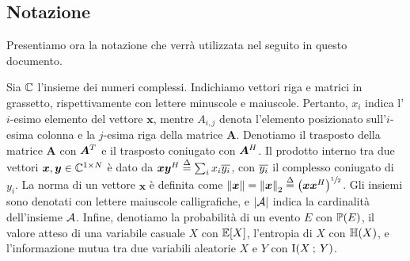 \subsection*{Notazione}

Presentiamo ora la notazione che verrà utilizzata nel seguito in questo
documento.

Sia \(\mathbb{C}\) l'insieme dei numeri complessi. Indichiamo vettori riga e matrici in
grassetto, rispettivamente con lettere minuscole e maiuscole.  Pertanto,
\(x_i\) indica l'\(i\)-esimo elemento del vettore \(\bm{x}\), mentre
\(A_{i,j}\) denota l'elemento posizionato sull'\(i\)-esima colonna e la
\(j\)-esima riga della matrice \(\bm{A}\). Denotiamo il trasposto della matrice
\(\bm{A}\) con \(\bm{A}^{T}\) e il trasposto coniugato con \(\bm{A}^{H}\).  Il
prodotto interno tra due vettori \(\bm{x},\bm{y} \in \mathbb{C}^{1 \times N}\) è dato
da \(\bm{x}\bm{y}^{H} \overset{\Delta}{=} \sum_i x_i \overline{y_i}\), con \(\overline{y_i}\) il
complesso coniugato di \(y_i\). La norma di un vettore \(\bm{x}\) è definita
come \(\lnorm \bm{x} \rnorm = \lnorm \bm{x} \rnorm_2 \define
\mleft(\bm{x}\conjtran{x}\mright)^{\sfrac{1}{2}}\). Gli insiemi sono denotati
con lettere maiuscole calligrafiche, e \(\abs{\set{A}}\) indica la cardinalità
dell'insieme \(\mathcal{A}\). Infine, denotiamo la probabilità di un evento \(E\)
con \(\prob{E}\), il valore atteso di una variabile casuale \(X\) con
\(\expect{X}\), l'entropia di \(X\) con \(\entropy{X}\), e l'informazione mutua
tra due variabili aleatorie \(X\) e \(Y\) con \(\mutual{X}{Y}\).
